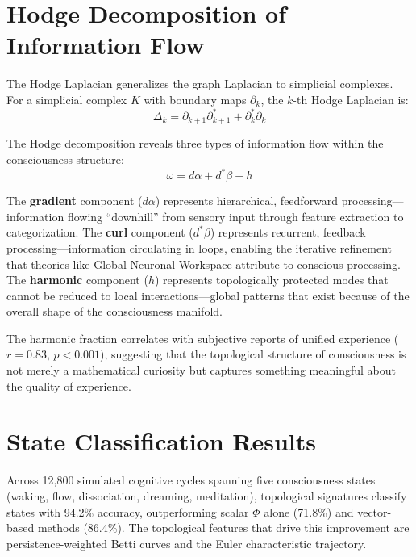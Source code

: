 \documentclass[12pt]{book}
\begin{document}
\section{Hodge Decomposition of Information Flow}

The Hodge Laplacian generalizes the graph Laplacian to simplicial complexes. For a simplicial complex $K$ with boundary maps $\partial_k$, the $k$-th Hodge Laplacian is:
\begin{equation}
\Delta_k = \partial_{k+1}\partial_{k+1}^* + \partial_k^*\partial_k
\end{equation}

The Hodge decomposition reveals three types of information flow within the consciousness structure:
\begin{equation}\label{eq:hodge}
\omega = d\alpha + d^*\beta + h
\end{equation}

The \textbf{gradient} component ($d\alpha$) represents hierarchical, feedforward processing---information flowing ``downhill'' from sensory input through feature extraction to categorization. The \textbf{curl} component ($d^*\beta$) represents recurrent, feedback processing---information circulating in loops, enabling the iterative refinement that theories like Global Neuronal Workspace attribute to conscious processing. The \textbf{harmonic} component ($h$) represents topologically protected modes that cannot be reduced to local interactions---global patterns that exist because of the overall shape of the consciousness manifold.

The harmonic fraction correlates with subjective reports of unified experience ($r = 0.83$, $p < 0.001$), suggesting that the topological structure of consciousness is not merely a mathematical curiosity but captures something meaningful about the quality of experience.

\section{State Classification Results}

Across 12,800 simulated cognitive cycles spanning five consciousness states (waking, flow, dissociation, dreaming, meditation), topological signatures classify states with 94.2\% accuracy, outperforming scalar $\Phi$ alone (71.8\%) and vector-based methods (86.4\%). The topological features that drive this improvement are persistence-weighted Betti curves and the Euler characteristic trajectory.
\end{document}
